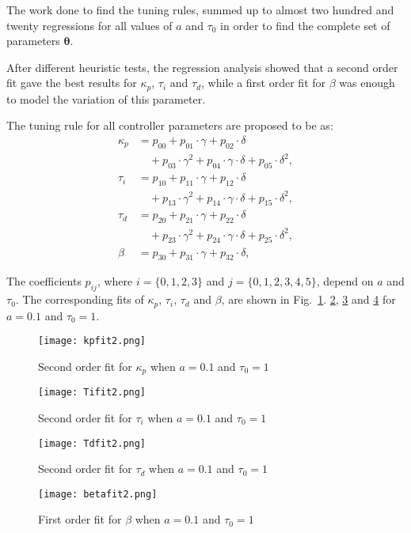 The work done to find the tuning rules, summed up to almost two hundred and twenty regressions for all values of $a$ and $\tau_0$ in order to find the complete set of parameters $\bm{\theta}$.

After different heuristic tests, the regression analysis showed that a second order fit gave the best results for $\kappa_p$, $\tau_i$ and $\tau_d$,  while  a first order fit for $\beta$ was enough to model the variation of this parameter. 

The tuning rule for all controller parameters are proposed to be as:  
%
\begin{align}
\kappa_p &= p_{00}+p_{01}\cdot\gamma+p_{02}\cdot\delta\nonumber\\
&\quad + p_{03}\cdot\gamma^2+p_{04}\cdot\gamma\cdot \delta+p_{05}\cdot\delta^2,\label{E:eqkp}\\
%
\tau_i &= p_{10}+p_{11}\cdot\gamma+p_{12}\cdot\delta\nonumber\\
&\quad + p_{13}\cdot\gamma^2+p_{14}\cdot\gamma\cdot \delta+p_{15}\cdot\delta^2,\label{E:eqTi}\\
%
\tau_d &= p_{20}+p_{21}\cdot\gamma+p_{22}\cdot\delta\nonumber\\
&\quad+p_{23}\cdot\gamma^2+p_{24}\cdot\gamma\cdot \delta+p_{25}\cdot\delta^2,\label{E:eqTd}\\
%
\beta &=p_{30}+p_{31}\cdot\gamma+p_{32}\cdot\delta,\label{E:eqbeta}
\end{align}
%

The coefficients $p_{ij}$, where $i=\{0,1,2,3\}$ and $j=\{0,1,2,3,4,5\}$, depend on $a$ and $\tau_0$. The corresponding fits of $\kappa_p$, $\tau_i$, $\tau_d$ and $\beta$, are shown in Fig.~\ref{F:cftoolkp}. \ref{F:cftoolTi}, \ref{F:cftoolTd} and \ref{F:cftoolbeta} for $a=0.1$ and $\tau_{0}=1$.   %
%
\begin{figure}[tb]
	\centering
	\texttt{[image: kpfit2.png]}
	\caption{Second order fit for $\kappa_p$ when $a=0.1$ and $\tau_{0}=1$}
	\label{F:cftoolkp}
\end{figure}
%
\begin{figure}[tb]
	\centering
	\texttt{[image: Tifit2.png]}
	\caption{Second order fit for $\tau_i$ when $a=0.1$ and $\tau_0=1$}
	\label{F:cftoolTi}
\end{figure}
%
\begin{figure}[tb]
	\centering
	\texttt{[image: Tdfit2.png]}
	\caption{Second order fit for $\tau_d$ when $a=0.1$ and $\tau_0=1$}
	\label{F:cftoolTd}
\end{figure}
%
\begin{figure}[tb]
	\centering
	\texttt{[image: betafit2.png]}
	\caption{First order fit for $\beta$ when $a=0.1$ and $\tau_0=1$}
	\label{F:cftoolbeta}
\end{figure}

